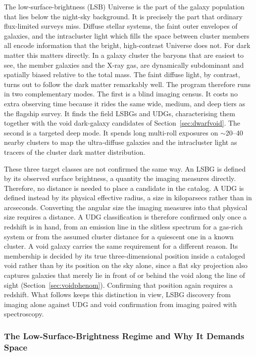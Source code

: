 \documentclass[10pt,onecolumn]{article}
\begin{document}
The low-surface-brightness (LSB) Universe is the part of the galaxy population that lies below the night-sky background. It is precisely the part that ordinary flux-limited surveys miss. Diffuse stellar systems, the faint outer envelopes of galaxies, and the intracluster light which fills the space between cluster members all encode information that the bright, high-contrast Universe does not. For dark matter this matters directly. In a galaxy cluster the baryons that are easiest to see, the member galaxies and the X-ray gas, are dynamically subdominant and spatially biased relative to the total mass. The faint diffuse light, by contrast, turns out to follow the dark matter remarkably well. The program therefore runs in two complementary modes. The first is a blind imaging census. It costs no extra observing time because it rides the same wide, medium, and deep tiers as the flagship survey. It finds the field LSBGs and UDGs, characterising them together with the void dark-galaxy candidates of Section~\ref{sec:dwarfvoid}. The second is a targeted deep mode. It spends long multi-roll exposures on $\sim$20--40 nearby clusters to map the ultra-diffuse galaxies and the intracluster light as tracers of the cluster dark matter distribution.

These three target classes are not confirmed the same way. An LSBG is defined by its observed surface brightness, a quantity the imaging measures directly. Therefore, no distance is needed to place a candidate in the catalog. A UDG is defined instead by its physical effective radius, a size in kiloparsecs rather than in arcseconds. Converting the angular size the imaging measures into that physical size requires a distance. A UDG classification is therefore confirmed only once a redshift is in hand, from an emission line in the slitless spectrum for a gas-rich system or from the assumed cluster distance for a quiescent one in a known cluster. A void galaxy carries the same requirement for a different reason. Its membership is decided by its true three-dimensional position inside a cataloged void rather than by its position on the sky alone, since a flat sky projection also captures galaxies that merely lie in front of or behind the void along the line of sight (Section~\ref{sec:voidphenom}). Confirming that position again requires a redshift. What follows keeps this distinction in view, LSBG discovery from imaging alone against UDG and void confirmation from imaging paired with spectroscopy.

\subsubsection{The Low-Surface-Brightness Regime and Why It Demands Space}
\end{document}
